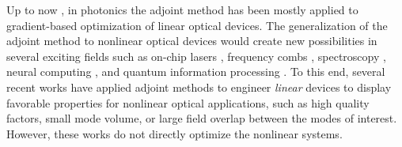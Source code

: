 

Up to now \cite{hughes2018adjoint}, in photonics the adjoint method has been mostly applied to gradient-based optimization of linear optical devices. The generalization of the adjoint method to nonlinear optical devices would create new possibilities in several exciting fields such as on-chip lasers \cite{yamashita_raman_2015}, frequency combs \cite{okawachi_octave-spanning_2011}, spectroscopy \cite{moon_absolute_1997}, neural computing \cite{khoram2018stochastic}, and quantum information processing \cite{guo_-chip_2016}.  To this end, several recent works \cite{lin_cavity-enhanced_2016,lin_topology_2017,bravo-abad_enhanced_2007} have applied adjoint methods to engineer \textit{linear} devices to display favorable properties for nonlinear optical applications, such as high quality factors, small mode volume, or large field overlap between the modes of interest.  However, these works do not directly optimize the nonlinear systems.

